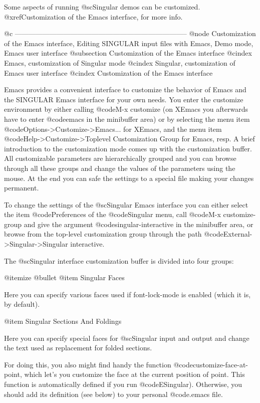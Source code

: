 Some aspects of running @sc{Singular} demos can be customized.
@xref{Customization of the Emacs interface}, for more info.


@c --------------------------------------------------------------------------
@node Customization of the Emacs interface, Editing SINGULAR input files with Emacs, Demo mode, Emacs user interface
@subsection Customization of the Emacs interface
@cindex Emacs, customization of Singular mode
@cindex Singular, customization of Emacs user interface
@cindex Customization of the Emacs interface

Emacs provides a convenient interface to customize the behavior of
Emacs and the SINGULAR Emacs interface for your own needs. You enter the
customize environment by either calling @code{M-x customize} (on XEmacs
you afterwards have to enter @code{emacs} in the minibuffer area) or by
selecting the menu item @code{Options->Customize->Emacs...} for XEmacs,
and the menu item @code{Help->Customize->Toplevel Customization Group}
for Emacs, resp. A brief introduction to the customization mode comes up
with the customization buffer. All customizable parameters are
hierarchically grouped and you can browse through all these groups and
change the values of the parameters using the mouse. At the end you can
safe the settings to a special file making your changes permanent.

To change the settings of the @sc{Singular} Emacs interface you can
either select the item @code{Preferences} of the @code{Singular} menu,
call @code{M-x customize-group} and give the argument
@code{singular-interactive} in the minibuffer area, or browse from the
top-level customization group through the path
@code{External->Singular->Singular interactive}.

The @sc{Singular} interface customization buffer is divided into four
groups:

@itemize @bullet
@item Singular Faces

Here you can specify various faces used if font-lock-mode is enabled
(which it is, by default).

@item Singular Sections And Foldings

Here you can specify special faces for @sc{Singular} input and output
and change the text used as replacement for folded sections.

For doing this, you also might
find handy the function @code{customize-face-at-point},
which let's you customize the face at the current position of
point. This function is automatically defined if you run
@code{ESingular}). Otherwise, you should add its definition (see below)
to your personal @code{.emacs} file.

